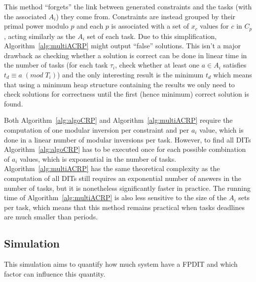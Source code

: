 \documentclass[conference]{IEEEtran}
\begin{document}
		This method ``forgets'' the link between generated constraints and the tasks
		(with the associated $A_i$) they come from. Constraints are instead grouped by their
		primal power modulo $p$ and each $p$ is associated with a set of $x_c$ values
		for $c$ in $C_p$, acting similarly as the $A_i$ set of each task. Due to this
		simplification, Algorithm~\ref{alg:multiACRP} might output ``false''
		solutions. This isn't a major drawback as checking whether a solution is
		correct can be done in linear time in the number of tasks (for each task
		$\tau_i$, check whether at least one $a \in A_i$ satisfies $t_d \equiv a \;
		(mod \; T_i)$) and the only interesting result is the minimum $t_d$ which
		means that using a minimum heap structure containing the results we only need
		to check solutions for correctness until the first (hence minimum) correct
		solution is found.

		Both Algorithm~\ref{alg:algoCRP} and Algorithm~\ref{alg:multiACRP} require the
		computation of one modular inversion per constraint and per $a_i$ value, which
		is done in a linear number of modular inversions per task. However, to
		find all DITs Algorithm~\ref{alg:algoCRP} has to be executed once for each possible
		combination of $a_i$ values, which is exponential in the number of tasks.
		Algorithm~\ref{alg:multiACRP} has the same theoretical complexity as the
		computation of all DITs still requires an exponential number of answers in the
		number of tasks, but it is nonetheless significantly faster in practice. The
		running time of Algorithm~\ref{alg:multiACRP} is also less sensitive to the
		size of the $A_i$ sets per task, which means that this method
		remains practical when tasks deadlines are much smaller than periods.

	\subsection{Simulation}
	\label{sct:noFPDITsimu}

	This simulation aims to quantify how much system have a FPDIT and which factor can influence this quantity.
\end{document}
